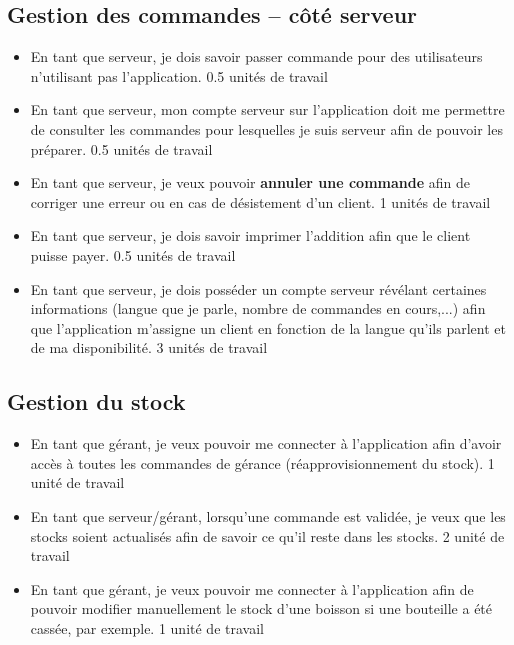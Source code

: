 \documentclass[11pt,a4paper]{article}
\begin{document}
\begin{spacing}{1.1}
\subsection{Gestion des commandes -- côté serveur}

\begin{itemize}[label=\textbullet,font=\color{cyan}]
\item En tant que serveur, je dois savoir passer commande pour des utilisateurs n'utilisant pas l'application.
{\color{cyan} 0.5 unités de travail}

\item En tant que serveur, mon compte serveur sur l'application doit me permettre de consulter les commandes pour lesquelles je suis serveur afin de pouvoir les préparer.
{\color{cyan} 0.5 unités de travail}

\item En tant que serveur, je veux pouvoir \textbf{annuler une commande} afin de corriger une erreur ou en cas de désistement d'un client.
{\color{cyan} 1 unités de travail}

\item En tant que serveur, je dois savoir imprimer l'addition afin que le client puisse payer.
{\color{cyan} 0.5 unités de travail}

\item En tant que serveur, je dois posséder un compte serveur révélant certaines informations (langue que je parle, nombre de commandes en cours,...) afin que l'application m'assigne un client en fonction de la langue qu'ils parlent et de ma disponibilité.
{\color{cyan} 3 unités de travail}
\end{itemize}
\subsection{Gestion du stock}
\begin{itemize}[label=\textbullet,font=\color{cyan}]
\item En tant que gérant, je veux pouvoir me connecter à l'application afin d'avoir accès à toutes les commandes de gérance (réapprovisionnement du stock).
{\color{cyan} 1 unité de travail}

\item En tant que serveur/gérant, lorsqu'une commande est validée, je veux que les stocks soient actualisés afin de savoir ce qu'il reste dans les stocks.
{\color{cyan} 2 unité de travail}

\item En tant que gérant, je veux pouvoir me connecter à l'application afin de pouvoir modifier manuellement le stock d'une boisson si une bouteille a été cassée, par exemple.
{\color{cyan} 1 unité de travail}
\end{itemize}



\end{spacing}
\end{document}
